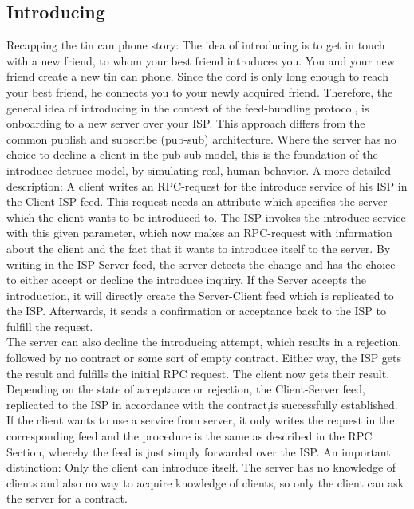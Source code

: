 \subsection{Introducing}
Recapping the tin can phone story: The idea of introducing is to get in touch with a new friend, to whom your best friend introduces you. You and your new friend create a new tin can phone. Since the cord is only long enough to reach your best friend, he connects you to your newly acquired friend. Therefore, the general idea of introducing in the context of the feed-bundling protocol, is onboarding to a new server over your ISP. This approach differs from the common publish and subscribe (pub-sub) architecture. Where the server has no choice to decline a client in the pub-sub model, this is the foundation of the introduce-detruce model, by simulating real, human behavior. A more detailed description: A client writes an RPC-request for the introduce service of his ISP in the Client-ISP feed. This request needs an attribute which specifies the server which the client wants to be introduced to. The ISP invokes the introduce service with this given parameter, which now makes an RPC-request with information about the client and the fact that it wants to introduce itself to the server. By writing in the ISP-Server feed, the server detects the change and has the choice to either accept or decline the introduce inquiry. If the Server accepts the introduction, it will directly create the Server-Client feed which is replicated to the ISP. Afterwards, it sends a confirmation or acceptance back to the ISP to fulfill the request. 
\\
The server can also decline the introducing attempt, which results in a rejection, followed by no contract or some sort of empty contract. Either way, the ISP gets the result and fulfills the initial RPC request. The client now gets their result. Depending on the state of acceptance or rejection, the Client-Server feed, replicated to the ISP in accordance with the contract,is successfully established. If the client wants to use a service from server, it only writes the request in the corresponding feed and the procedure is the same as described in the RPC Section, whereby the feed is just simply forwarded over the ISP. 
An important distinction: Only the client can introduce itself. The server has no knowledge of clients and also no way to acquire knowledge of clients, so only the client can ask the server for a contract.


